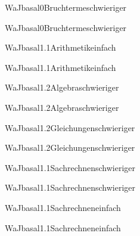 \documentclass[12pt]{article}
\begin{document}
\begin{Add}{WaJ}{basal0}{Bruchterme}{schwieriger}
\solution{ }
\end{Add}
\begin{Add}{WaJ}{basal0}{Bruchterme}{schwieriger}
\end{Add}

\begin{Add}{WaJ}{basal1.1}{Arithmetik}{einfach}
\solution{ }
\end{Add}
\begin{Add}{WaJ}{basal1.1}{Arithmetik}{einfach}
\end{Add}

\begin{Add}{WaJ}{basal1.2}{Algebra}{schwieriger}
\solution{ }
\end{Add}
\begin{Add}{WaJ}{basal1.2}{Algebra}{schwieriger}
\end{Add}

    \begin{Add}{WaJ}{basal1.2}{Gleichungen}{schwieriger}
    \solution{ }
    \end{Add}
    \begin{Add}{WaJ}{basal1.2}{Gleichungen}{schwieriger}
    \end{Add}
    

\begin{Add}{WaJ}{basal1.1}{Sachrechnen}{schwieriger}
\solution{ }
\end{Add}
\begin{Add}{WaJ}{basal1.1}{Sachrechnen}{schwieriger}
\end{Add}

\begin{Add}{WaJ}{basal1.1}{Sachrechnen}{einfach}
\solution{ }
\end{Add}
\begin{Add}{WaJ}{basal1.1}{Sachrechnen}{einfach}
\end{Add}
\end{document}
